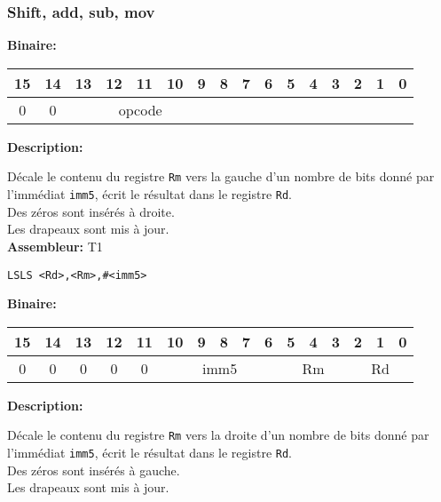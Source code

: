 \documentclass{article}
\newcounter{subsubsubsection}[subsubsection]
\begin{document}
\subsubsection{Shift, add, sub, mov}

\textbf{Binaire:}\\

\begin{tabular}{| c c c c c c c c c c c c c c c c |}
\hline
15 & 14 & \multicolumn{1}{|c}{13} & 12 & 11 & 10 & 9 & \multicolumn{1}{|c}{8} & 7 & 6 & 5 & 4 & 3 & 2 & 1 & 0 \\
\hline
0 & 0 & \multicolumn{5}{|c}{opcode} & \multicolumn{9}{|c|}{} \\
\hline
\end{tabular}



\textbf{Description: }

Décale le contenu du registre \texttt{Rm} vers la gauche d'un nombre de bits donné par l'immédiat \texttt{imm5}, écrit le résultat dans le registre \texttt{Rd}.\\
Des zéros sont insérés à droite.\\
Les drapeaux sont mis à jour.\\

\textbf{Assembleur:} T1

\begin{lstlisting}
LSLS <Rd>,<Rm>,#<imm5>
\end{lstlisting}

\textbf{Binaire:}\\

\begin{tabular}{| c c c c c c c c c c c c c c c c |}
\hline
15 & 14 & 13 & \multicolumn{1}{|c}{12} & 11 & \multicolumn{1}{|c}{10} & 9 & 8 & 7 & 6 & \multicolumn{1}{|c}{5} & 4 & 3 & \multicolumn{1}{|c}{2} & 1 & 0 \\
\hline
0 & 0 & 0 & \multicolumn{1}{|c}{0} & 0 & \multicolumn{5}{|c|}{imm5} & \multicolumn{3}{|c|}{Rm} & \multicolumn{3}{|c|}{Rd} \\
\hline
\end{tabular}


\textbf{Description: }

Décale le contenu du registre \texttt{Rm} vers la droite d'un nombre de bits donné par l'immédiat \texttt{imm5}, écrit le résultat dans le registre \texttt{Rd}.\\
Des zéros sont insérés à gauche.\\
Les drapeaux sont mis à jour.\\
\end{document}
